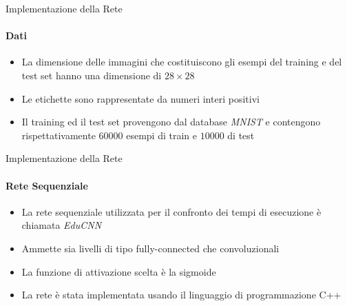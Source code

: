 \documentclass[
 ]{beamer}
\begin{document}
\begin{frame}{Implementazione della Rete}
    \framesubtitle{Dati}
    \begin{itemize} [<+->]
        \setlength\itemsep{3em}
        \item \large La dimensione delle immagini che costituiscono gli esempi del training e del test set hanno una dimensione di $28 \times 28$
        \item \large Le etichette sono rappresentate da numeri interi positivi
        \item \large Il training ed il test set provengono dal database \emph{MNIST} e contengono rispettativamente $60000$ esempi di train e $10000$ di test 
    \end{itemize}
\end{frame}

\begin{frame}{Implementazione della Rete}
    \framesubtitle{Rete Sequenziale}
    \begin{itemize} [<+->]
        \setlength\itemsep{3em}
        \item \large La rete sequenziale utilizzata per il confronto dei tempi di esecuzione è chiamata \emph{EduCNN}
        \item \large Ammette sia livelli di tipo fully-connected che convoluzionali
        \item \large La funzione di attivazione scelta è la sigmoide
        \item \large La rete è stata implementata usando il linguaggio di programmazione C++  
    \end{itemize}
\end{frame}
\end{document}
